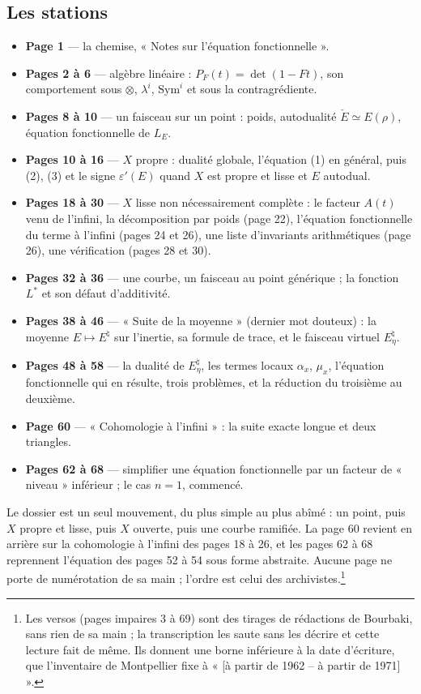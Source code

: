 \documentclass[11pt,a4paper]{article}
\begin{document}
\subsection*{Les stations}

\begin{itemize}
  \item \textbf{Page 1} --- la chemise, « Notes sur l'équation fonctionnelle ».
  \item \textbf{Pages 2 à 6} --- algèbre linéaire : $P_F(t) = \det(1 - Ft)$,
    son comportement sous $\otimes$, $\lambda^i$, $\mathrm{Sym}^i$ et sous la
    contragrédiente.
  \item \textbf{Pages 8 à 10} --- un faisceau sur un point : poids,
    autodualité $\check E \simeq E(\rho)$, équation fonctionnelle de $L_E$.
  \item \textbf{Pages 10 à 16} --- $X$ propre : dualité globale, l'équation
    (1) en général, puis (2), (3) et le signe $\varepsilon'(E)$ quand $X$ est
    propre et lisse et $E$ autodual.
  \item \textbf{Pages 18 à 30} --- $X$ lisse non nécessairement complète : le
    facteur $A(t)$ venu de l'infini, la décomposition par poids (page 22),
    l'équation fonctionnelle du terme à l'infini (pages 24 et 26), une liste
    d'invariants arithmétiques (page 26), une vérification (pages 28 et 30).
  \item \textbf{Pages 32 à 36} --- une courbe, un faisceau au point
    générique ; la fonction $L^{*}$ et son défaut d'additivité.
  \item \textbf{Pages 38 à 46} --- « Suite de la moyenne » (dernier mot
    douteux) : la moyenne
    $E \mapsto E^{\natural}$ sur l'inertie, sa formule de trace, et le
    faisceau virtuel $E_\eta^{\natural}$.
  \item \textbf{Pages 48 à 58} --- la dualité de $E_\eta^{\natural}$, les
    termes locaux $\alpha_x$, $\mu_x$, l'équation fonctionnelle qui en résulte,
    trois problèmes, et la réduction du troisième au deuxième.
  \item \textbf{Page 60} --- « Cohomologie à l'infini » : la suite exacte longue
    et deux triangles.
  \item \textbf{Pages 62 à 68} --- simplifier une équation fonctionnelle par un
    facteur de « niveau » inférieur ; le cas $n = 1$, commencé.
\end{itemize}

Le dossier est un seul mouvement, du plus simple au plus abîmé : un point,
puis $X$ propre et lisse, puis $X$ ouverte, puis une courbe ramifiée. La
page 60 revient en arrière sur la cohomologie à l'infini des pages 18 à 26, et
les pages 62 à 68 reprennent l'équation des pages 52 à 54 sous forme abstraite.
Aucune page ne porte de numérotation de sa main ; l'ordre est celui des
archivistes.\footnote{Les versos (pages impaires 3 à 69) sont des tirages de
rédactions de Bourbaki, sans rien de sa main ; la transcription les saute
sans les décrire et cette lecture fait de même. Ils donnent une borne
inférieure à la date d'écriture, que l'inventaire de Montpellier fixe à
« [à partir de 1962 -- à partir de 1971] ».}
\end{document}
